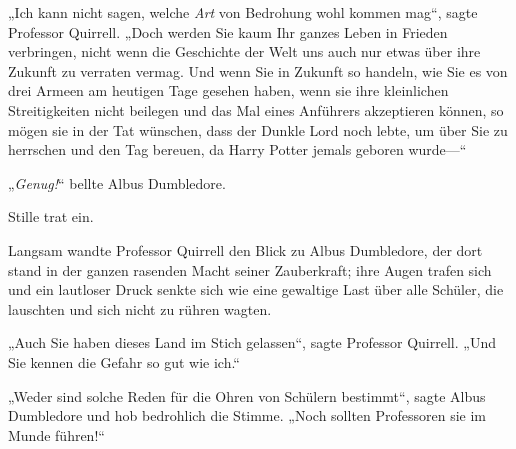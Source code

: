 „Ich kann nicht sagen, welche \emph{Art} von Bedrohung wohl kommen mag“, sagte Professor Quirrell. „Doch werden Sie kaum Ihr ganzes Leben in Frieden verbringen, nicht wenn die Geschichte der Welt uns auch nur etwas über ihre Zukunft zu verraten vermag. Und wenn Sie in Zukunft so handeln, wie Sie es von drei Armeen am heutigen Tage gesehen haben, wenn sie ihre kleinlichen Streitigkeiten nicht beilegen und das Mal eines Anführers akzeptieren können, so mögen sie in der Tat wünschen, dass der Dunkle Lord noch lebte, um über Sie zu herrschen und den Tag bereuen, da Harry Potter jemals geboren wurde—“

„\emph{Genug!}“ bellte Albus Dumbledore.

Stille trat ein.

Langsam wandte Professor Quirrell den Blick zu Albus Dumbledore, der dort stand in der ganzen rasenden Macht seiner Zauberkraft; ihre Augen trafen sich und ein lautloser Druck senkte sich wie eine gewaltige Last über alle Schüler, die lauschten und sich nicht zu rühren wagten.

„Auch Sie haben dieses Land im Stich gelassen“, sagte Professor Quirrell. „Und Sie kennen die Gefahr so gut wie ich.“

„Weder sind solche Reden für die Ohren von Schülern bestimmt“, sagte Albus Dumbledore und hob bedrohlich die Stimme. „Noch sollten Professoren sie im Munde führen!“

